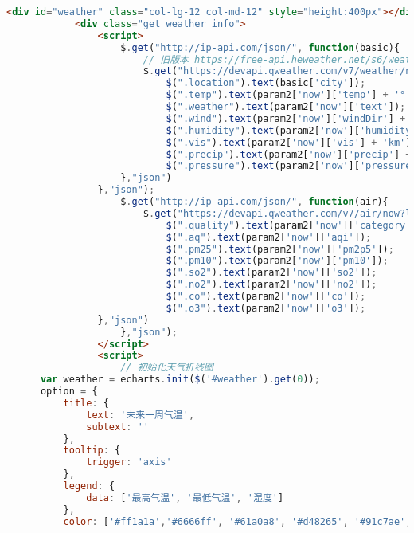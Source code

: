\documentclass[12pt,AutoFakeBold]{article}
\begin{document}
\begin{appendices}
\begin{lstlisting}[language=html]
	<div id="weather" class="col-lg-12 col-md-12" style="height:400px"></div>
            <div class="get_weather_info">
                <script>
                    $.get("http://ip-api.com/json/", function(basic){
                        // 旧版本 https://free-api.heweather.net/s6/weather/now?location=" + basic['ip'] + "&key=b27e0f8b9678447c91a8edbcded8b055
                        $.get("https://devapi.qweather.com/v7/weather/now?location=" + basic['lon'] + "," + basic['lat'] + "&key=fec38f63412241e781fed6688eac7452", function(param2){
                            $(".location").text(basic['city']);
                            $(".temp").text(param2['now']['temp'] + '°');
                            $(".weather").text(param2['now']['text']);
                            $(".wind").text(param2['now']['windDir'] + '(' + param2['now']['windSpeed'] + '级)');
                            $(".humidity").text(param2['now']['humidity'] + '%');
                            $(".vis").text(param2['now']['vis'] + 'km');
                            $(".precip").text(param2['now']['precip'] + 'mm');
                            $(".pressure").text(param2['now']['pressure'] + 'hPa');
                    },"json")
                },"json");
                    $.get("http://ip-api.com/json/", function(air){
                        $.get("https://devapi.qweather.com/v7/air/now?location=" + air['lon'] + "," + air['lat'] + "&key=fec38f63412241e781fed6688eac7452", function(param2){
                            $(".quality").text(param2['now']['category']);
                            $(".aq").text(param2['now']['aqi']);
                            $(".pm25").text(param2['now']['pm2p5']);
                            $(".pm10").text(param2['now']['pm10']);
                            $(".so2").text(param2['now']['so2']);
                            $(".no2").text(param2['now']['no2']);
                            $(".co").text(param2['now']['co']);
                            $(".o3").text(param2['now']['o3']);
                },"json")
                    },"json");
                </script>
                <script>
                    // 初始化天气折线图
      var weather = echarts.init($('#weather').get(0));
      option = {
          title: {
              text: '未来一周气温',
              subtext: ''
          },
          tooltip: {
              trigger: 'axis'
          },
          legend: {
              data: ['最高气温', '最低气温', '湿度']
          },
          color: ['#ff1a1a','#6666ff', '#61a0a8', '#d48265', '#91c7ae','#749f83',  '#ca8622', '#bda29a','#6e7074', '#546570', '#c4ccd3'],

\end{lstlisting}
\end{appendices}
\end{document}
